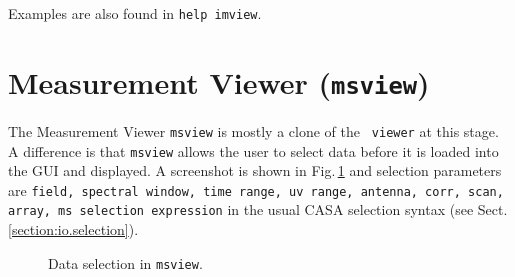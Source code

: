 Examples are also found in {\tt help imview}.

\section{Measurement Viewer ({\tt msview})}
\label{section:display.msview}

The Measurement Viewer {\tt msview} is mostly a clone of the {\tt
  viewer} at this stage. A difference is that {\tt msview} allows the
user to select data before it is loaded into the GUI and displayed. A
screenshot is shown in Fig.\,\ref{fig:msview-selection} and selection
parameters are {\tt field, spectral window, time range, uv range,
  antenna, corr, scan, array, ms selection expression} in the usual
CASA selection syntax (see Sect.\,\ref{section:io.selection}). 


\begin{figure}[h!]
\begin{center}
\caption{\label{fig:msview-selection} Data selection in {\tt msview}.}
\hrulefill
\end{center}
\end{figure}
 